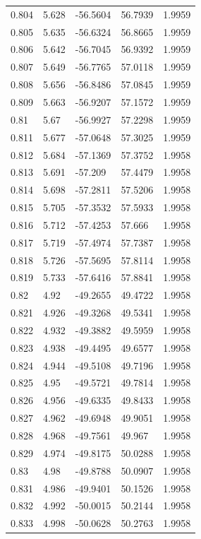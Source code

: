\begin{tabular}{lllll}
0.804 & 5.628 & -56.5604 & 56.7939 & 1.9959 \\
0.805 & 5.635 & -56.6324 & 56.8665 & 1.9959 \\
0.806 & 5.642 & -56.7045 & 56.9392 & 1.9959 \\
0.807 & 5.649 & -56.7765 & 57.0118 & 1.9959 \\
0.808 & 5.656 & -56.8486 & 57.0845 & 1.9959 \\
0.809 & 5.663 & -56.9207 & 57.1572 & 1.9959 \\
0.81 & 5.67 & -56.9927 & 57.2298 & 1.9959 \\
0.811 & 5.677 & -57.0648 & 57.3025 & 1.9959 \\
0.812 & 5.684 & -57.1369 & 57.3752 & 1.9958 \\
0.813 & 5.691 & -57.209 & 57.4479 & 1.9958 \\
0.814 & 5.698 & -57.2811 & 57.5206 & 1.9958 \\
0.815 & 5.705 & -57.3532 & 57.5933 & 1.9958 \\
0.816 & 5.712 & -57.4253 & 57.666 & 1.9958 \\
0.817 & 5.719 & -57.4974 & 57.7387 & 1.9958 \\
0.818 & 5.726 & -57.5695 & 57.8114 & 1.9958 \\
0.819 & 5.733 & -57.6416 & 57.8841 & 1.9958 \\
0.82 & 4.92 & -49.2655 & 49.4722 & 1.9958 \\
0.821 & 4.926 & -49.3268 & 49.5341 & 1.9958 \\
0.822 & 4.932 & -49.3882 & 49.5959 & 1.9958 \\
0.823 & 4.938 & -49.4495 & 49.6577 & 1.9958 \\
0.824 & 4.944 & -49.5108 & 49.7196 & 1.9958 \\
0.825 & 4.95 & -49.5721 & 49.7814 & 1.9958 \\
0.826 & 4.956 & -49.6335 & 49.8433 & 1.9958 \\
0.827 & 4.962 & -49.6948 & 49.9051 & 1.9958 \\
0.828 & 4.968 & -49.7561 & 49.967 & 1.9958 \\
0.829 & 4.974 & -49.8175 & 50.0288 & 1.9958 \\
0.83 & 4.98 & -49.8788 & 50.0907 & 1.9958 \\
0.831 & 4.986 & -49.9401 & 50.1526 & 1.9958 \\
0.832 & 4.992 & -50.0015 & 50.2144 & 1.9958 \\
0.833 & 4.998 & -50.0628 & 50.2763 & 1.9958 \\

\end{tabular}
